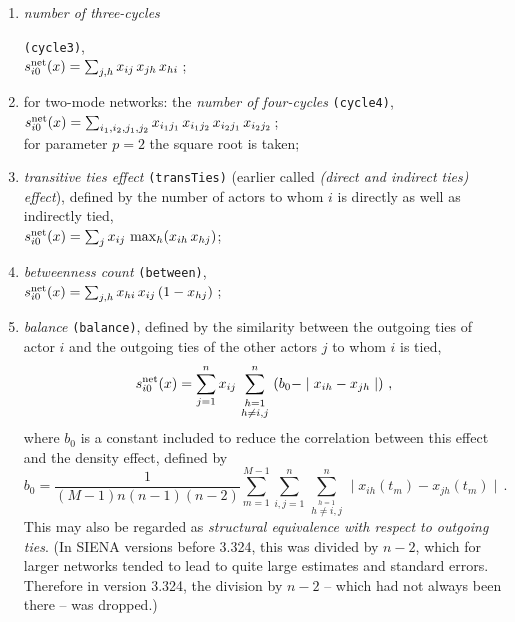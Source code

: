 \documentclass[a4paper,fleqn,11pt]{article}
\newcommand{\+}{\, + \,}
\newcommand{\neqsum}[3]
{\, \sum_{\stackrel{\scriptstyle #1 = 1}{\scriptstyle #2 \neq #3}}^n \,}
\newcommand{\vit}{\theenumi}
\newcommand{\SI}{{\sf SIENA }}
\begin{document}
\begin{enumerate}
 \item \hypertarget{T_cycle3}{{\em number of three-cycles}}
 \texttt{(cycle3)}, \\
 $s^{\rm net}_{i\vit}(x) =  \sum_{j, h} x_{ij}\, x_{jh}\, x_{hi}\,$;


 \item for two-mode networks: the {\em number of four-cycles}
 \texttt{(cycle4)}, \\
 $s^{\rm net}_{i\vit}(x) =  \sum_{i_1, i_2, j_1, j_2}
            x_{i_1 j_1}\, x_{i_1 j_2}\, x_{i_2 j_1}\, x_{i_2 j_2}\,$;\\
 for parameter $p=2$ the square root is taken;

 \item {\em transitive ties effect} \texttt{(transTies)}
 (earlier called \emph{(direct and indirect ties) effect}),
 defined by
 the number of actors to whom $i$ is directly as well as indirectly tied, \\
 $s^{\rm net}_{i\vit}(x) =  \sum_j x_{ij} \, \max_h (x_{ih}\, x_{hj}) $;

 \item {\em betweenness count} \texttt{(between)},\\
 $s^{\rm net}_{i\vit}(x) =  \sum_{j, h} x_{hi}\, x_{ij}\, (1-x_{hj})\,$;

 \item {\em balance} \texttt{(balance)}, defined by the similarity between
 the outgoing ties of actor $i$ and the outgoing ties of the other actors
 $j$ to whom $i$ is tied,
 \[ s^{\rm net}_{i\vit}(x) = \sum_{j=1}^n x_{ij} \neqsum{h}{h}{i,j}
 \left( b_0 - \mid x_{ih} - x_{jh} \mid \right)\, , \]
 where $b_0$ is a constant included to reduce the correlation
 between this effect and the density effect,
 \hypertarget{T_meanbal}{defined by}
 \[ b_0 = \frac{1}{(M-1)n(n-1)(n-2)} \sum_{m=1}^{M-1}
 \sum_{i, j=1}^n \neqsum{h}{h}{i,j}
 \mid x_{ih}(t_m) - x_{jh}(t_m) \mid \,.\]
 This may also be regarded as \emph{structural equivalence
 with respect to outgoing ties}.
 (In \SI versions before 3.324, this was divided by $n-2$, which for larger
 networks tended to lead to quite large estimates and standard errors.
 Therefore in version 3.324, the division by $n-2$
 -- which had not always been there -- was dropped.)


\end{enumerate}
\end{document}
